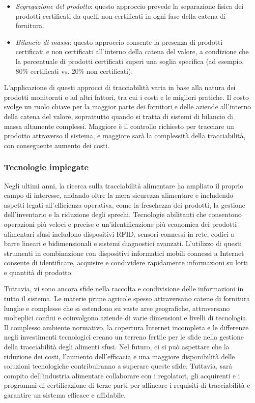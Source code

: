 \begin{itemize}
    \item \textit{Segregazione del prodotto}: questo approccio prevede la separazione fisica dei prodotti certificati da quelli non certificati in ogni fase della catena di fornitura.
    \item \textit{Bilancio di massa}: questo approccio consente la presenza di prodotti certificati e non certificati all'interno della catena del valore, a condizione che la percentuale di prodotti certificati superi una soglia specifica (ad esempio, 80\% certificati vs. 20\% non certificati).
   
\end{itemize}

L'applicazione di questi approcci di tracciabilità varia in base alla natura dei prodotti monitorati e ad altri fattori, tra cui i costi e le migliori pratiche. Il costo svolge un ruolo chiave per la maggior parte dei fornitori e delle aziende all'interno della catena del valore, soprattutto quando si tratta di sistemi di bilancio di massa altamente complessi. Maggiore è il controllo richiesto per tracciare un prodotto attraverso il sistema, e maggiore sarà la complessità della tracciabilità, con conseguente aumento dei costi.

\subsubsection{Tecnologie impiegate}

Negli ultimi anni, la ricerca sulla tracciabilità alimentare ha ampliato il proprio campo di interesse, andando oltre la mera sicurezza alimentare e includendo aspetti legati all'efficienza operativa, come la freschezza dei prodotti, la gestione dell'inventario e la riduzione degli sprechi. Tecnologie abilitanti che consentono operazioni più veloci e precise e un'identificazione più economica dei prodotti alimentari sfusi includono dispositivi RFID, sensori connessi in rete, codici a barre lineari e bidimensionali e sistemi diagnostici avanzati. L'utilizzo di questi strumenti in combinazione con dispositivi informatici mobili connessi a Internet consente di identificare, acquisire e condividere rapidamente informazioni su lotti e quantità di prodotto.

Tuttavia, vi sono ancora sfide nella raccolta e condivisione delle informazioni in tutto il sistema. Le materie prime agricole spesso attraversano catene di fornitura lunghe e complesse che si estendono su vaste aree geografiche, attraversano molteplici confini e coinvolgono aziende di varie dimensioni e livelli di tecnologia. Il complesso ambiente normativo, la copertura Internet incompleta e le differenze negli investimenti tecnologici creano un terreno fertile per le sfide nella gestione della tracciabilità degli alimenti sfusi. Nel futuro, ci si può aspettare che la riduzione dei costi, l'aumento dell'efficacia e una maggiore disponibilità delle soluzioni tecnologiche contribuiranno a superare queste sfide. Tuttavia, sarà compito dell'industria alimentare collaborare con i regolatori, gli acquirenti e i programmi di certificazione di terze parti per allineare i requisiti di tracciabilità e garantire un sistema efficace e affidabile.

